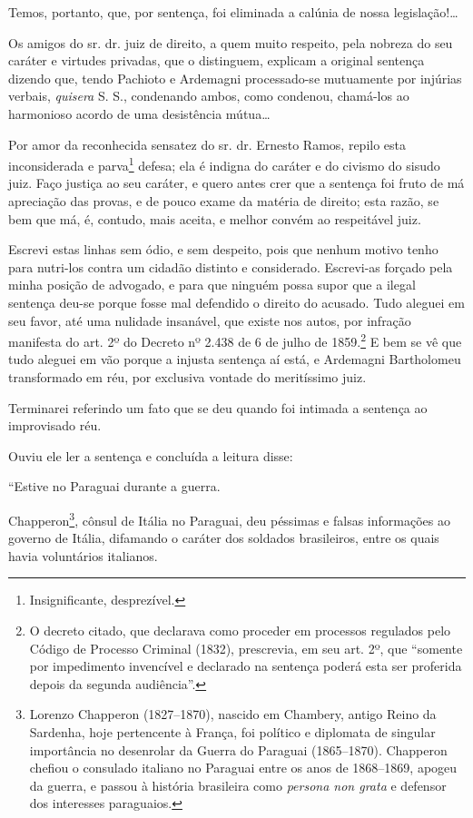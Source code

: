 {\begin{flushright}
Temos, portanto, que, por sentença, foi eliminada a calúnia de nossa
legislação!\ldots{}

Os amigos do sr. dr. juiz de direito, a quem muito respeito, pela
nobreza do seu caráter e virtudes privadas, que o distinguem, explicam a
original sentença dizendo que, tendo Pachioto e Ardemagni processado-se
mutuamente por injúrias verbais, \emph{quisera} S. S., condenando ambos,
como condenou, chamá-los ao harmonioso acordo de uma desistência
mútua\ldots{}

Por amor da reconhecida sensatez do sr. dr. Ernesto Ramos, repilo esta
inconsiderada e parva\footnote{ Insignificante, desprezível.} defesa;
ela é indigna do caráter e do civismo do sisudo juiz. Faço justiça ao
seu caráter, e quero antes crer que a sentença foi fruto de má
apreciação das provas, e de pouco exame da matéria de direito; esta
razão, se bem que má, é, contudo, mais aceita, e melhor convém ao
respeitável juiz.

Escrevi estas linhas sem ódio, e sem despeito, pois que nenhum motivo
tenho para nutri-los contra um cidadão distinto e considerado.
Escrevi-as forçado pela minha posição de advogado, e para que ninguém
possa supor que a ilegal sentença deu-se porque fosse mal defendido o
direito do acusado. Tudo aleguei em seu favor, até uma nulidade
insanável, que existe nos autos, por infração manifesta do art. 2º do
Decreto nº 2.438 de 6 de julho de 1859.\footnote{ O decreto citado, que
  declarava como proceder em processos regulados pelo Código de Processo
  Criminal (1832), prescrevia, em seu art. 2º, que ``somente por
  impedimento invencível e declarado na sentença poderá esta ser
  proferida depois da segunda audiência''.} E bem se vê que tudo aleguei
em vão porque a injusta sentença aí está, e Ardemagni Bartholomeu
transformado em réu, por exclusiva vontade do meritíssimo juiz.

Terminarei referindo um fato que se deu quando foi intimada a sentença
ao improvisado réu.

Ouviu ele ler a sentença e concluída a leitura disse:

``Estive no Paraguai durante a guerra.

Chapperon\footnote{ Lorenzo Chapperon (1827--1870), nascido em Chambery,
  antigo Reino da Sardenha, hoje pertencente à França, foi político e
  diplomata de singular importância no desenrolar da Guerra do Paraguai
  (1865--1870). Chapperon chefiou o consulado italiano no Paraguai entre
  os anos de 1868--1869, apogeu da guerra, e passou à história brasileira
  como \emph{persona non grata} e defensor dos interesses paraguaios.},
cônsul de Itália no Paraguai, deu péssimas e falsas informações ao
governo de Itália, difamando o caráter dos soldados brasileiros, entre
os quais havia voluntários italianos.


\end{flushright}}
